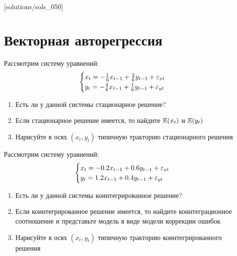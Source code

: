 

[solutions/sols_050]

\chapter{Векторная авторегрессия}



\begin{problem}
Рассмотрим систему уравнений:
\[
\begin{cases}
x_t = -\frac{1}{6}x_{t-1} + \frac{2}{6}y_{t-1} + \varepsilon_{xt} \\
y_t = -\frac{4}{6}x_{t-1} + \frac{1}{6}y_{t-1} + \varepsilon_{yt}
\end{cases}
\]
\begin{enumerate}
\item Есть ли у данной системы стационарное решение?
\item Если стационарное решение имеется, то найдите $\mathbb{E}(x_t)$ и $\mathbb{E}(y_t)$
\item Нарисуйте в осях $(x_t, y_t)$ типичную тракторию стационарного решения
\end{enumerate}

\begin{sol}

\end{sol}
\end{problem}


\begin{problem}
Рассмотрим систему уравнений:
\[
\begin{cases}
x_t = -0.2x_{t-1} + 0.6y_{t-1} + \varepsilon_{xt} \\
y_t = 1.2x_{t-1} + 0.4y_{t-1} + \varepsilon_{yt}
\end{cases}
\]
\begin{enumerate}
\item Есть ли у данной системы коинтегрированное решение?
\item Если коинтегрированное решение имеется, то найдите коинтеграционное соотношение и представьте модель в виде модели коррекции ошибок
\item Нарисуйте в осях $(x_t, y_t)$ типичную тракторию коинтегрированного решения
\end{enumerate}

\begin{sol}

\end{sol}
\end{problem}



